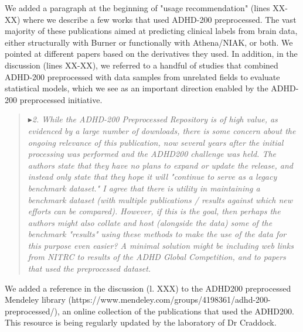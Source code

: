 \documentclass[authoryear,3p]{elsarticle}
\begin{document}
We added a paragraph at the beginning of "usage recommendation" (lines XX-XX) where we describe a few works that used ADHD-200 preprocessed. The vast majority of these publications aimed at predicting clinical labels from brain data, either structurally with Burner or functionally with Athena/NIAK, or both. We pointed at different papers based on the derivatives they used. In addition, in the discussion (lines XX-XX), we referred to a handful of studies that combined ADHD-200 preprocessed with data samples from unrelated fields to evaluate statistical models, which we see as an important direction enabled by the ADHD-200 preprocessed initiative. 


\begin{quote}
$\blacktriangleright$\emph{2. While the ADHD-200 Preprocessed Repository is of high value, as evidenced by a large number of downloads, there is some concern about the ongoing relevance of this publication, now several years after the initial processing was performed and the ADHD200 challenge was held. The authors state that they have no plans to expand or update the release, and instead only state that they hope it will "continue to serve as a legacy benchmark dataset."  I agree that there is utility in maintaining a benchmark dataset (with multiple publications / results against which new efforts can be compared). However, if this is the goal, then perhaps the authors might also collate and host (alongside the data) some of the benchmark "results" using these methods to make the use of the data for this purpose even easier?  A minimal solution might be including web links from NITRC to results of the ADHD Global Competition, and to papers that used the preprocessed dataset.
}
\end{quote}

We added a reference in the discussion (l. XXX) to the ADHD200 preprocessed Mendeley library (https://www.mendeley.com/groups/4198361/adhd-200-preprocessed/), an online collection of the publications that used the ADHD200. This resource is being regularly updated by the laboratory of Dr Craddock. 
\end{document}
